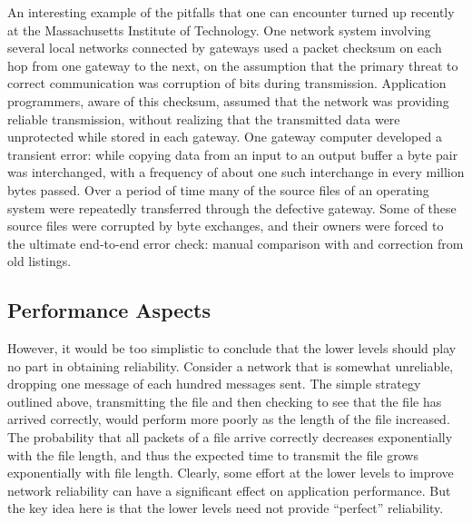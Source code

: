 \documentclass[a4paper,12pt,notitlepage,twoside,openright]{article}
\begin{document}
An interesting example of the pitfalls that one can encounter turned up
recently at the Massachusetts Institute of Technology. One network
system involving several local networks connected by gateways used a
packet checksum on each hop from one gateway to the next, on the
assumption that the primary threat to correct communication was
corruption of bits during transmission. Application programmers, aware
of this checksum, assumed that the network was providing reliable
transmission, without realizing that the transmitted data were
unprotected while stored in each gateway. One gateway computer
developed a transient error: while copying data from an input to an
output buffer a byte pair was interchanged, with a frequency of about
one such interchange in every million bytes passed. Over a period of
time many of the source files of an operating system were repeatedly
transferred through the defective gateway. Some of these source files
were corrupted by byte exchanges, and their owners were forced to the
ultimate end-to-end error check: manual comparison with and correction
from old listings.

\hypertarget{performance-aspects}{%
\subsection{Performance Aspects}\label{performance-aspects}}

However, it would be too simplistic to conclude that the lower levels
should play no part in obtaining reliability. Consider a network that is
somewhat unreliable, dropping one message of each hundred messages sent.
The simple strategy outlined above, transmitting the file and then
checking to see that the file has arrived correctly, would perform more
poorly as the length of the file increased. The probability that all
packets of a file arrive correctly decreases exponentially
with the file length, and thus the expected time to transmit the file
grows exponentially with file length. Clearly, some effort at the lower
levels to improve network reliability can have a significant effect on
application performance. But the key idea here is that the lower levels
need not provide ``perfect'' reliability.
\end{document}
